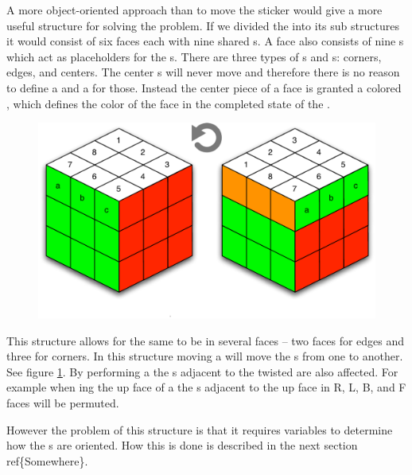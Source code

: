 A more object-oriented approach than to move the sticker would give a more useful structure for solving the problem.
If we divided the \rubik{} into its sub structures it would consist of six faces each with nine shared \cubie{}s.
A face also consists of nine \cubicle{}s which act as placeholders for the \cpiece{}s. 
There are three types of \cpiece{}s and \cubicle{}s: corners, edges, and centers. 
The center \cpiece{}s will never move and therefore there is no reason to define a \cubicle{} and a \cpiece{} for those. Instead the center piece of a face is granted a colored \facelet{}, which defines the color of the face in the completed state of the \rubik{}.
\begin{figure}[h]
	\centering
		\includegraphics[scale=0.6]{input/pics/twistOfUpFace.pdf}
	\caption{}
	\label{fig:twistOfUpFace}
\end{figure}
This structure allows for the same \cubicle{} to be in several faces -- two faces for edges and three for corners. 
In this structure moving a \face{} will move the \cpiece{}s from one \cubicle{} to another. See figure \ref{fig:twistOfUpFace}. By performing a \twist{} the \face{}s adjacent to the twisted \face{} are also affected. 
For example when \twist{}ing the up face of a \rubik{} the \cubie{}s adjacent to the up face in R, L, B, and F faces will be permuted.

However the problem of this structure is that it requires variables to determine how the \cubie{}s are oriented. 
How this is done is described in the next section ref\{Somewhere\}.
